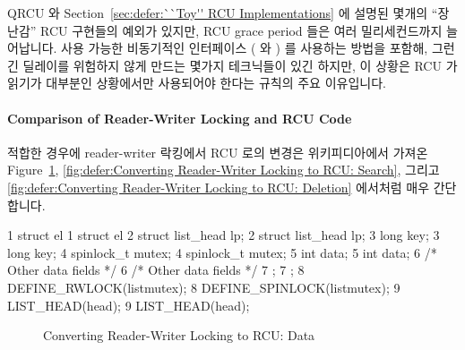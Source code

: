 QRCU 와
Section~\ref{sec:defer:``Toy'' RCU Implementations} 에 설명된 몇개의 ``장난감''
RCU 구현들의 예외가 있지만, RCU grace period 들은 여러 밀리세컨드까지
늘어납니다.
사용 가능한 비동기적인 인터페이스 ( 와 ) 를
사용하는 방법을 포함해, 그런 긴 딜레이를 위험하지 않게 만드는 몇가지 테크닉들이
있긴 하지만, 이 상황은 RCU 가 읽기가 대부분인 상황에서만 사용되어야 한다는
규칙의 주요 이유입니다.

\paragraph{Comparison of Reader-Writer Locking and RCU Code}

적합한 경우에 reader-writer 락킹에서 RCU 로의 변경은
위키피디아에서 가져온~\cite{WikipediaRCU}
Figure~\ref{fig:defer:Converting Reader-Writer Locking to RCU: Data},
\ref{fig:defer:Converting Reader-Writer Locking to RCU: Search},
그리고
\ref{fig:defer:Converting Reader-Writer Locking to RCU: Deletion}
에서처럼 매우 간단합니다.

{ \scriptsize
\begin{verbbox}
 1 struct el {                           1 struct el {
 2   struct list_head lp;                2   struct list_head lp;
 3   long key;                           3   long key;
 4   spinlock_t mutex;                   4   spinlock_t mutex;
 5   int data;                           5   int data;
 6   /* Other data fields */             6   /* Other data fields */
 7 };                                    7 };
 8 DEFINE_RWLOCK(listmutex);             8 DEFINE_SPINLOCK(listmutex);
 9 LIST_HEAD(head);                      9 LIST_HEAD(head);
\end{verbbox}
}
\begin{figure}[htbp]
\hspace*{5em}
\theverbbox
\caption{Converting Reader-Writer Locking to RCU: Data}
\label{fig:defer:Converting Reader-Writer Locking to RCU: Data}
\end{figure}

